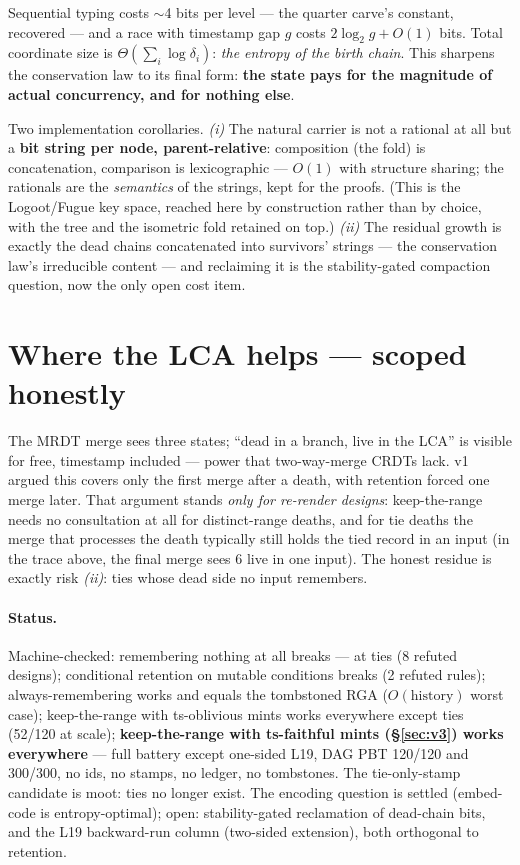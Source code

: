 \documentclass[11pt]{article}
\begin{document}
\noindent Sequential typing costs $\sim$4 bits per level --- the
quarter carve's constant, recovered --- and a race with timestamp gap
$g$ costs $2\log_2 g + O(1)$ bits. Total coordinate size is
$\Theta(\sum_i \log \delta_i)$: \emph{the entropy of the birth chain}.
This sharpens the conservation law to its final form: \textbf{the state
pays for the magnitude of actual concurrency, and for nothing else}.

Two implementation corollaries. \emph{(i)} The natural carrier is not a
rational at all but a \textbf{bit string per node, parent-relative}:
composition (the fold) is concatenation, comparison is lexicographic
--- $O(1)$ with structure sharing; the rationals are the
\emph{semantics} of the strings, kept for the proofs. (This is the
Logoot/Fugue key space, reached here by construction rather than by
choice, with the tree and the isometric fold retained on top.)
\emph{(ii)} The residual growth is exactly the dead chains concatenated
into survivors' strings --- the conservation law's irreducible content
--- and reclaiming it is the stability-gated compaction question, now
the only open cost item.

\section{Where the LCA helps --- scoped honestly}

The MRDT merge sees three states; ``dead in a branch, live in the LCA''
is visible for free, timestamp included --- power that two-way-merge
CRDTs lack. v1 argued this covers only the first merge after a death,
with retention forced one merge later. That argument stands \emph{only
for re-render designs}: keep-the-range needs no consultation at all for
distinct-range deaths, and for tie deaths the merge that processes the
death typically still holds the tied record in an input (in the trace
above, the final merge sees $6$ live in one input). The honest residue
is exactly risk \emph{(ii)}: ties whose dead side no input remembers.

\paragraph{Status.} Machine-checked: remembering nothing at all breaks
--- at ties (8 refuted designs); conditional retention on mutable
conditions breaks (2 refuted rules); always-remembering works and equals
the tombstoned RGA ($O(\text{history})$ worst case); keep-the-range with
ts-oblivious mints works everywhere except ties (52/120 at scale);
\textbf{keep-the-range with ts-faithful mints (\S\ref{sec:v3}) works
everywhere} --- full battery except one-sided L19, DAG PBT 120/120 and
300/300, no ids, no stamps, no ledger, no tombstones. The tie-only-stamp
candidate is moot: ties no longer exist. The encoding question is settled
(embed-code is entropy-optimal); open: stability-gated reclamation of
dead-chain bits, and the L19 backward-run column (two-sided
extension), both orthogonal to retention.
\end{document}
